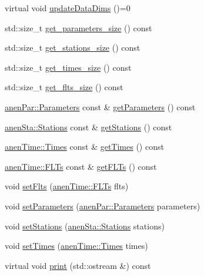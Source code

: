\begin{DoxyCompactItemize}
\item 
virtual void \mbox{\hyperlink{class_forecasts_a8c7d29af8edb5c3bc6a6aad2220506a9}{update\+Data\+Dims}} ()=0
\item 
std\+::size\+\_\+t \mbox{\hyperlink{class_forecasts_a445efc69dce930a1c308d17289466e68}{get\+\_\+parameters\+\_\+size}} () const
\item 
std\+::size\+\_\+t \mbox{\hyperlink{class_forecasts_abec05f11da96ef797e741178b2a7335c}{get\+\_\+stations\+\_\+size}} () const
\item 
std\+::size\+\_\+t \mbox{\hyperlink{class_forecasts_a267f33699ada17b57e2c05a25a01d1c3}{get\+\_\+times\+\_\+size}} () const
\item 
std\+::size\+\_\+t \mbox{\hyperlink{class_forecasts_a5cea0e9e7f39a95a26878fefc0c29b7b}{get\+\_\+flts\+\_\+size}} () const
\item 
\mbox{\hyperlink{classanen_par_1_1_parameters}{anen\+Par\+::\+Parameters}} const  \& \mbox{\hyperlink{class_forecasts_a08adfc1510d1a2a506390276dcad8e09}{get\+Parameters}} () const
\item 
\mbox{\hyperlink{classanen_sta_1_1_stations}{anen\+Sta\+::\+Stations}} const  \& \mbox{\hyperlink{class_forecasts_a31978316404dedda6ae3860d7844d855}{get\+Stations}} () const
\item 
\mbox{\hyperlink{classanen_time_1_1_times}{anen\+Time\+::\+Times}} const  \& \mbox{\hyperlink{class_forecasts_ac256fce5eb5e6e773f7f8579bf10c7d7}{get\+Times}} () const
\item 
\mbox{\hyperlink{classanen_time_1_1_f_l_ts}{anen\+Time\+::\+F\+L\+Ts}} const  \& \mbox{\hyperlink{class_forecasts_a3762d8a919986b5874291dfc528303a1}{get\+F\+L\+Ts}} () const
\item 
void \mbox{\hyperlink{class_forecasts_aa15a4e56c5747afc1594131ad30e4fc3}{set\+Flts}} (\mbox{\hyperlink{classanen_time_1_1_f_l_ts}{anen\+Time\+::\+F\+L\+Ts}} flts)
\item 
void \mbox{\hyperlink{class_forecasts_a8dd1f257833a71c72deb3e8d595d607e}{set\+Parameters}} (\mbox{\hyperlink{classanen_par_1_1_parameters}{anen\+Par\+::\+Parameters}} parameters)
\item 
void \mbox{\hyperlink{class_forecasts_aeb1ca08f01a0ff5145607f8e962fb750}{set\+Stations}} (\mbox{\hyperlink{classanen_sta_1_1_stations}{anen\+Sta\+::\+Stations}} stations)
\item 
void \mbox{\hyperlink{class_forecasts_a85263c55dda71ef3363afbd2be337eed}{set\+Times}} (\mbox{\hyperlink{classanen_time_1_1_times}{anen\+Time\+::\+Times}} times)
\item 
virtual void \mbox{\hyperlink{class_forecasts_addb1f75f0dc6833c466453c51256812c}{print}} (std\+::ostream \&) const
\end{DoxyCompactItemize}
